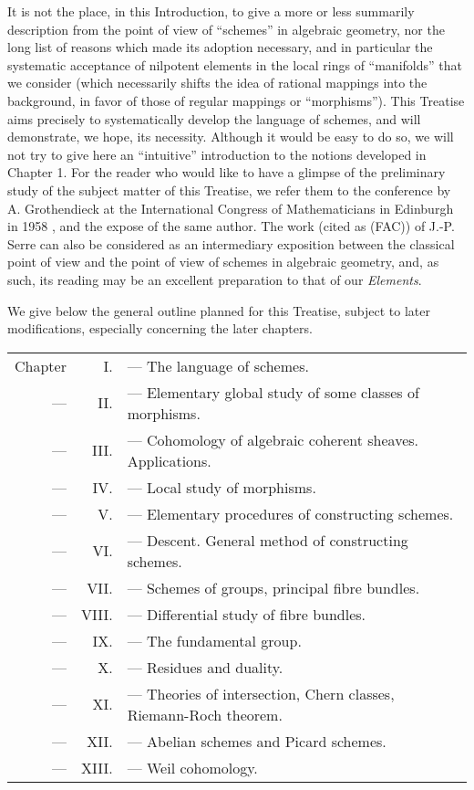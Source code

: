 \documentclass{book}
\begin{document}
It is not the place, in this Introduction, to give a more or less summarily
description from the point of view of ``schemes'' in algebraic geometry, nor the
long list of reasons which made its adoption necessary, and in particular the
systematic acceptance of nilpotent elements in the local rings of ``manifolds''
that we consider (which necessarily shifts the idea of rational mappings into
the background, in favor of those of regular mappings or ``morphisms''). This
Treatise aims precisely to systematically develop the language of schemes, and
will demonstrate, we hope, its necessity. Although it would be easy to do so,
we will not try to give here an ``intuitive'' introduction to the
notions developed in Chapter 1. For the reader who would like to have a glimpse
of the preliminary study of the subject matter of this Treatise, we refer them
to the conference by A. Grothendieck at the International Congress of
Mathematicians in Edinburgh in 1958 \cite{7}, and the expose \cite{8} of the
same author. The work \cite{14} (cited as (FAC)) of J.-P. Serre can also be
considered as an intermediary exposition between the classical point of view and
the point of view of schemes in algebraic geometry, and, as such, its reading
may be an excellent preparation to that of our \emph{Elements}.

\asttri

We give below the general outline planned for this Treatise, subject to later
modifications, especially concerning the later chapters.

\begin{tabular}{rrl}
Chapter & I. & --- The language of schemes.\\
--- & II. & --- Elementary global study of some classes of morphisms.\\
--- & III. & --- Cohomology of algebraic coherent sheaves. Applications.\\
--- & IV. & --- Local study of morphisms.\\
--- & V. & --- Elementary procedures of constructing schemes.\\
--- & VI. & --- Descent. General method of constructing schemes.\\
--- & VII. & --- Schemes of groups, principal fibre bundles.\\
--- & VIII. & --- Differential study of fibre bundles.\\
--- & IX. & --- The fundamental group.\\
--- & X. & --- Residues and duality.\\
--- & XI. & --- Theories of intersection, Chern classes, Riemann-Roch theorem.\\
--- & XII. & --- Abelian schemes and Picard schemes.\\
--- & XIII. & --- Weil cohomology.
\end{tabular}\\
\end{document}
